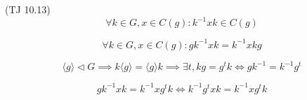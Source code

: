 \begin{frame}{(TJ 10.13)}
  \[
    \forall k \in G, x \in C(g): k^{-1} x k \in C(g)
  \]

  \[
    \forall k \in G, x \in C(g): gk^{-1}xk = k^{-1}xkg
  \]

  \[
    \langle g \rangle \triangleleft G \implies k \langle g \rangle = \langle g \rangle k \implies
    \exists t, kg = g^{t}k \iff gk^{-1} = k^{-1}g^t
  \]

  \[
    gk^{-1}xk = k^{-1}xg^{t}k \iff k^{-1}g^{t}xk = k^{-1}xg^{t}k
  \]
\end{frame}
